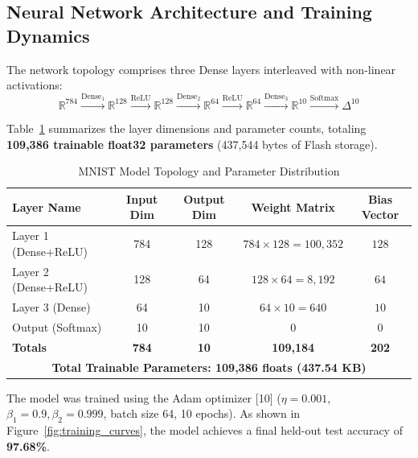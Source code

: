 \documentclass[11pt,a4paper]{article}
\begin{document}
\subsection{Neural Network Architecture and Training Dynamics}
The network topology comprises three Dense layers interleaved with non-linear activations:
\begin{equation}
    \mathbb{R}^{784} \xrightarrow{\text{Dense}_1} \mathbb{R}^{128} \xrightarrow{\text{ReLU}} \mathbb{R}^{128} \xrightarrow{\text{Dense}_2} \mathbb{R}^{64} \xrightarrow{\text{ReLU}} \mathbb{R}^{64} \xrightarrow{\text{Dense}_3} \mathbb{R}^{10} \xrightarrow{\text{Softmax}} \Delta^{10}
\end{equation}

Table~\ref{tab:model_architecture} summarizes the layer dimensions and parameter counts, totaling \textbf{109,386 trainable float32 parameters} (437,544 bytes of Flash storage).

\begin{table}[htbp]
\centering
\small
\caption{MNIST Model Topology and Parameter Distribution}
\label{tab:model_architecture}
\begin{tabular}{lcccc}
\toprule
\textbf{Layer Name} & \textbf{Input Dim} & \textbf{Output Dim} & \textbf{Weight Matrix} & \textbf{Bias Vector} \\
\midrule
Layer 1 (Dense+ReLU) & 784                & 128                 & $784 \times 128 = 100,352$ & $128$ \\
Layer 2 (Dense+ReLU) & 128                & 64                  & $128 \times 64 = 8,192$    & $64$  \\
Layer 3 (Dense)      & 64                 & 10                  & $64 \times 10 = 640$       & $10$  \\
Output (Softmax)     & 10                 & 10                  & $0$                        & $0$   \\
\midrule
\textbf{Totals}      & \textbf{784}       & \textbf{10}         & \textbf{109,184}           & \textbf{202} \\
\multicolumn{5}{c}{\textbf{Total Trainable Parameters: 109,386 floats (437.54 KB)}} \\
\bottomrule
\end{tabular}
\end{table}

The model was trained using the Adam optimizer [10] ($\eta = 0.001$, $\beta_1 = 0.9, \beta_2 = 0.999$, batch size 64, 10 epochs). As shown in Figure~\ref{fig:training_curves}, the model achieves a final held-out test accuracy of \textbf{97.68\%}.
\end{document}
